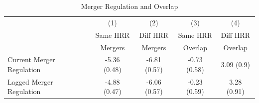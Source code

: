 \begin{table}[ht!]
\centering
\caption{Merger Regulation and Overlap\label{tab:subs_comp}}
\centering
\begin{tabular}[t]{l>{}c>{}cc>{}c}
\toprule
 & (1) & (2) & (3) & (4)\\
 & Same HRR & Diff HRR & Same HRR & Diff HRR\\
  & Mergers & Mergers & Overlap & Overlap\\
\midrule
Current Merger Regulation & \textcolor[HTML]{2E8B57}{-5.36 (0.48)} & \textcolor[HTML]{2E8B57}{-6.81 (0.57)} & -0.73 (0.58) & \textcolor[HTML]{E69F00}{3.09 (0.9)}\\
Lagged Merger Regulation & \textcolor[HTML]{2E8B57}{-4.88 (0.47)} & \textcolor[HTML]{2E8B57}{-6.06 (0.57)} & -0.23 (0.59) & \textcolor[HTML]{E69F00}{3.28 (0.91)}\\
\bottomrule
\end{tabular}
\end{table}
